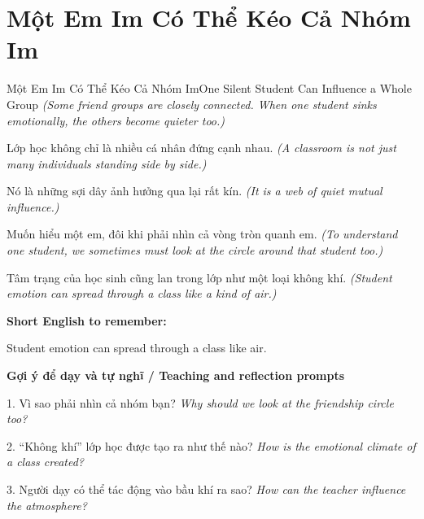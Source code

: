 \section{Một Em Im Có Thể Kéo Cả Nhóm Im}
\begin{truyen}{Một Em Im Có Thể Kéo Cả Nhóm Im}{One Silent Student Can Influence a Whole Group}
\textit{(Some friend groups are closely connected. When one student sinks emotionally, the others become quieter too.)}

Lớp học không chỉ là nhiều cá nhân đứng cạnh nhau.
\textit{(A classroom is not just many individuals standing side by side.)}

Nó là những sợi dây ảnh hưởng qua lại rất kín.
\textit{(It is a web of quiet mutual influence.)}

Muốn hiểu một em, đôi khi phải nhìn cả vòng tròn quanh em.
\textit{(To understand one student, we sometimes must look at the circle around that student too.)}

\end{truyen}

\begin{baihoc}
Tâm trạng của học sinh cũng lan trong lớp như một loại không khí.
\textit{(Student emotion can spread through a class like a kind of air.)}
\end{baihoc}

\begin{ghinhoanh}
\textbf{Short English to remember:}

Student emotion can spread through a class like air.

\end{ghinhoanh}

\begin{tuhocnhanh}
\textbf{Gợi ý để dạy và tự nghĩ / Teaching and reflection prompts}

1. Vì sao phải nhìn cả nhóm bạn? \textit{Why should we look at the friendship circle too?}

2. “Không khí” lớp học được tạo ra như thế nào? \textit{How is the emotional climate of a class created?}

3. Người dạy có thể tác động vào bầu khí ra sao? \textit{How can the teacher influence the atmosphere?}
\end{tuhocnhanh}
\ngancach

